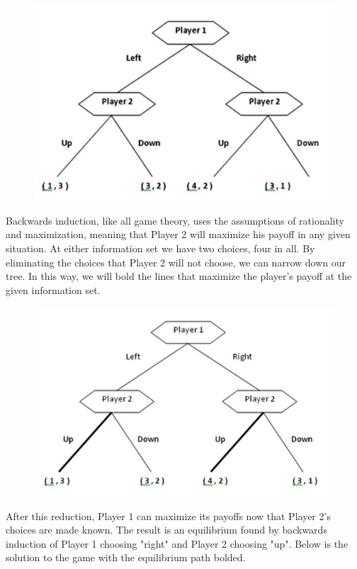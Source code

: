\documentclass[]{report}
\begin{document}
\begin{figure}[h!]
	\centering
	\includegraphics[width=0.7\linewidth]{images/BackwardInduction1}
	\caption{}
	\label{fig:BackwardInduction1}
\end{figure}
Backwards induction, like all game theory, uses the assumptions of rationality and maximization, meaning that Player 2 will maximize his payoff in any given situation. At either information set we have two choices, four in all. By eliminating the choices that Player 2 will not choose, we can narrow down our tree. In this way, we will bold the lines that maximize the player's payoff at the given information set.


\begin{figure}[h!]
	\centering
	\includegraphics[width=0.7\linewidth]{images/BackwardInduction2}
	\caption{}
	\label{fig:BackwardInduction2}
\end{figure}
After this reduction, Player 1 can maximize its payoffs now that Player 2's choices are made known. The result is an equilibrium found by backwards induction of Player 1 choosing "right" and Player 2 choosing "up". Below is the solution to the game with the equilibrium path bolded.
\end{document}
